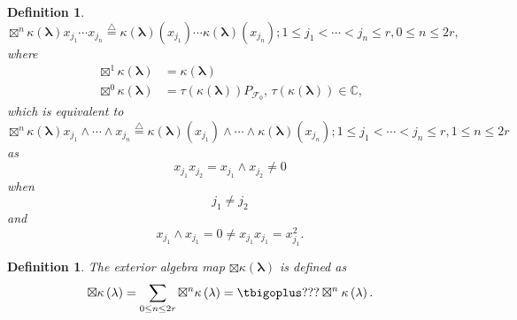\documentclass[aps, preprint]{revtex4}
\newtheorem{definition}[theorem]{Definition}
\begin{document}
\begin{definition}
\begin{equation} \boxtimes ^{n}\kappa  \left (\mathbf{\lambda }\right ) x_{j_{1}} \cdots  x_{j_{n}}\overset{\triangle }{ =}\kappa  \left (\mathbf{\lambda }\right ) \left (x_{j_{1}}\right ) \cdots  \kappa  \left (\mathbf{\lambda }\right ) \left (x_{j_{n}}\right ) ;1 \leq j_{1} <\cdots  <j_{n} \leq r ,0 \leq n \leq 2 r\text{,}
\end{equation}where
\begin{align} \boxtimes ^{1}\kappa  \left (\mathbf{\lambda }\right ) &  =\kappa  \left (\mathbf{\lambda }\right ) \\
 \boxtimes ^{0}\kappa  \left (\mathbf{\lambda }\right ) &  =\tau  \left (\kappa  \left (\mathbf{\lambda }\right )\right ) P_{\mathcal{F}_{0}} ,\,\tau  \left (\kappa  \left (\mathbf{\lambda }\right )\right ) \in \mathbb{C}\text{,}\end{align}which is equivalent to
\begin{equation} \boxtimes ^{n}\kappa  \left (\mathbf{\lambda }\right ) x_{j_{1}} \wedge \cdots  \wedge x_{j_{n}}\overset{\triangle }{ =}\kappa  \left (\mathbf{\lambda }\right ) \left (x_{j_{1}}\right ) \wedge \cdots  \wedge \kappa  \left (\mathbf{\lambda }\right ) \left (x_{j_{n}}\right ) ;1 \leq j_{1} <\cdots  <j_{n} \leq r ,1 \leq n \leq 2 r
\end{equation}as
\begin{equation}x_{j_{1}} x_{j_{2}} =x_{j_{1}} \wedge x_{j_{2}} \neq 0
\end{equation}when
\begin{equation}j_{1} \neq j_{2}
\end{equation}and
\begin{equation}x_{j_{1}} \wedge x_{j_{1}} =0 \neq x_{j_{1}} x_{j_{1}} =x_{j_{1}}^{2}\text{.}
\end{equation}
\end{definition}


\begin{definition}
The exterior algebra map $ \boxtimes \kappa  \left (\mathbf{\lambda }\right )$ is defined as
\begin{equation} \boxtimes \kappa  \left (\mathbf{\lambda }\right ) =\sum _{0 \leq n \leq 2 r} \boxtimes ^{n}\kappa  \left (\mathbf{\lambda }\right ) =\tbigoplus ??? \boxtimes ^{n}\kappa  \left (\mathbf{\lambda }\right )\text{.}
\end{equation}
\end{definition}
\end{document}
